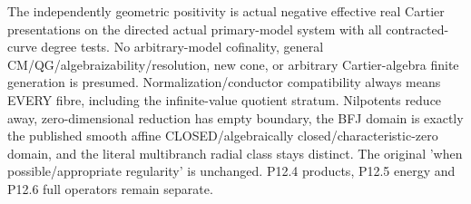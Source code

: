 \documentclass[11pt]{article}
\begin{document}
\begin{Full422Data}
The independently geometric positivity is actual negative effective real Cartier presentations on the directed actual primary-model system with all contracted-curve degree tests. No arbitrary-model cofinality, general CM/QG/algebraizability/resolution, new cone, or arbitrary Cartier-algebra finite generation is presumed. Normalization/conductor compatibility always means EVERY fibre, including the infinite-value quotient stratum. Nilpotents reduce away, zero-dimensional reduction has empty boundary, the BFJ domain is exactly the published smooth affine CLOSED/algebraically closed/characteristic-zero domain, and the literal multibranch radial class stays distinct. The original 'when possible/appropriate regularity' is unchanged. P12.4 products, P12.5 energy and P12.6 full operators remain separate.

\end{Full422Data}
\end{document}
